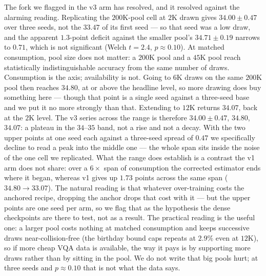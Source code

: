 The fork we flagged in the v3 arm has resolved, and it resolved against the alarming reading.
Replicating the $200$K-pool cell at $2$K drawn gives $34.00 \pm 0.47$ over three seeds, not the
$33.47$ of its first seed --- so that seed was a low draw, and the apparent $1.3$-point deficit
against the smaller pool's $34.71 \pm 0.19$ narrows to $0.71$, which is not significant
(Welch $t{=}2.4$, $p{\approx}0.10$). At matched consumption, pool size does not matter: a
$200$K pool and a $45$K pool reach statistically indistinguishable accuracy from the same number
of draws. Consumption is the axis; availability is not. Going to $6$K draws on the same $200$K
pool then reaches $34.80$, at or above the headline level, so more drawing does buy something
here --- though that point is a single seed against a three-seed base and we put it no more
strongly than that. Extending to $12$K returns $34.07$, back at the $2$K level. The v3 series
across the range is therefore $34.00 \pm 0.47$, $34.80$, $34.07$: a plateau in the $34$--$35$ band,
not a rise and not a decay. With the two upper points at one seed each against a three-seed spread
of $0.47$ we specifically decline to read a peak into the middle one --- the whole span sits inside
the noise of the one cell we replicated. What the range does establish is a contrast the v1 arm
does not share: over a $6\times$ span of consumption the corrected estimator ends where it began,
whereas v1 gives up $1.73$ points across the same span ($34.80 \to 33.07$). The natural reading is
that whatever over-training costs the anchored recipe, dropping the anchor drops that cost with it
--- but the upper points are one seed per arm, so we flag that as the hypothesis the dense
checkpoints are there to test, not as a result.
The practical reading is the useful one: a larger pool costs nothing at
matched consumption and keeps successive draws near-collision-free (the birthday bound caps
repeats at $2.9\%$ even at $12$K), so if more cheap VQA data is available, the way it pays is
by supporting more draws rather than by sitting in the pool. We do not write that big pools hurt;
at three seeds and $p{\approx}0.10$ that is not what the data says.


